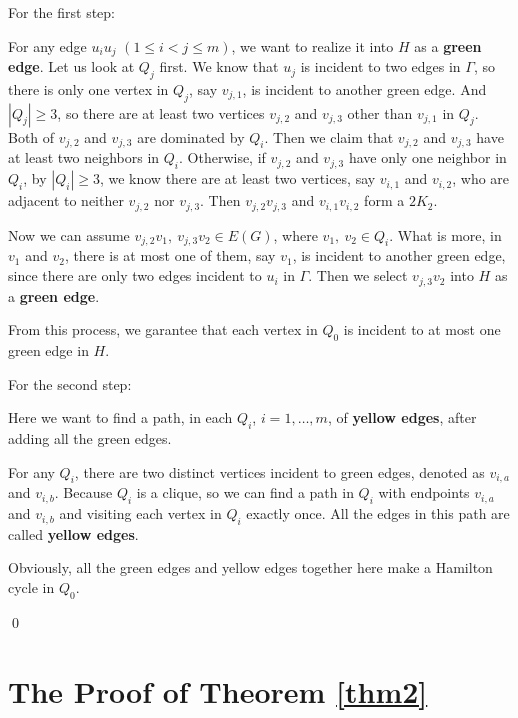 \documentclass[12pt]{article}
\begin{document}
For the first step:

For any edge $u_iu_j$ $(1\le i<j\le m)$, we want to realize it into $H$ as a {\bf green edge}. Let us look at $Q_j$ first. We know that $u_j$ is incident to two edges in $\Gamma$, so there is only one vertex in $Q_j$, say $v_{j,1}$, is incident to another green edge. And $|Q_j|\ge3$, so there are at least two vertices $v_{j,2}$ and $v_{j,3}$ other than $v_{j,1}$ in $Q_j$. Both of $v_{j,2}$ and $v_{j,3}$ are dominated by $Q_i$. Then we claim that $v_{j,2}$ and $v_{j,3}$ have at least two neighbors in $Q_i$. Otherwise, if $v_{j,2}$ and $v_{j,3}$ have only one neighbor in $Q_i$, by $|Q_i|\ge3$, we know there are at least two vertices, say $v_{i,1}$ and $v_{i,2}$, who are adjacent to neither $v_{j,2}$ nor $v_{j,3}$. Then $v_{j,2}v_{j,3}$ and $v_{i,1}v_{i,2}$ form a $2K_2$.

Now we can assume $v_{j,2}v_1,~v_{j,3}v_2\in E(G)$, where $v_1,~v_2\in Q_i$. What is more, in $v_1$ and $v_2$, there is at most one of them, say $v_1$, is incident to another green edge, since there are only two edges incident to $u_i$ in $\Gamma$. Then we select $v_{j,3}v_2$ into $H$ as a {\bf green edge}.

From this process, we garantee that each vertex in $Q_0$ is incident to at most one green edge in $H$.

For the second step:

Here we want to find a path, in each $Q_i$, $i=1,\dots,m$, of {\bf yellow edges}, after adding all the green edges.

For any $Q_i$, there are two distinct vertices incident to green edges, denoted as $v_{i,a}$ and $v_{i,b}$. Because $Q_i$ is a clique, so we can find a path in $Q_i$ with endpoints $v_{i,a}$ and $v_{i,b}$ and visiting each vertex in $Q_i$ exactly once. All the edges in this path are called {\bf yellow edges}.

Obviously, all the green edges and yellow edges together here make a Hamilton cycle in $Q_0$.








\qed












\section{The Proof of Theorem \ref{thm2}}
\end{document}

